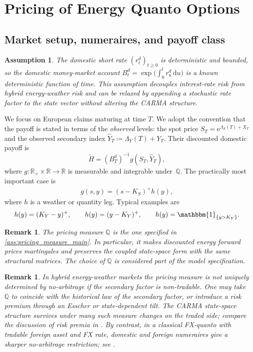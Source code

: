 \documentclass[10pt,a4paper,reqno]{amsart}
\newtheorem{remark}[theorem]{Remark}
\newtheorem{assumption}[theorem]{Assumption}
\newcommand{\R}{\mathbb{R}}
\newcommand{\Q}{\mathbb{Q}}
\newcommand{\1}{\mathbbm{1}}
\newcommand{\dd}{\mathrm{d}}
\newcommand{\ee}{\mathrm{e}}
\begin{document}
\section{Pricing of Energy Quanto Options}\label{sec:pricing-quanto-options}

\subsection{Market setup, numeraires, and payoff class}

\begin{assumption}\label{ass:interest_rate}
The domestic short rate $(r_t^d)_{t \ge 0}$ is deterministic and bounded,
so the domestic money-market account
$B_t^d = \exp\!\bigl(\int_0^t r_u^d\,\dd u\bigr)$ is a known deterministic
function of time. This assumption decouples interest-rate risk from hybrid
energy-weather risk and can be relaxed by appending a stochastic rate factor to
the state vector without altering the CARMA structure.
\end{assumption}

We focus on European claims maturing at time $T$. We adopt the convention
that the payoff is stated in terms of the \emph{observed} levels: the spot
price $S_T = \ee^{\Lambda_S(T)+X_T}$ and the observed secondary index
$\widehat{Y}_T \coloneqq \Lambda_Y(T)+Y_T$. Their discounted domestic payoff
is
$$
\widetilde{H}
= (B_T^d)^{-1} g(S_T,\widehat{Y}_T),
$$
where $g:\R_+ \times \R \to \R$ is measurable and integrable under~$\Q$.
The practically most important case is
\begin{align}\label{eq:quanto_payoff_general}
  g(s,y) = (s-K_S)^+ h(y),
\end{align}
where $h$ is a weather or quantity leg. Typical examples are
$$
h(y) = (K_Y-y)^+,\qquad
h(y) = (y-K_Y)^+,\qquad
h(y) = \1_{\{y>K_Y\}}.
$$

\begin{remark}
The pricing measure $\Q$ is the one specified in
\ref{ass:pricing_measure_main}. In particular, it
makes discounted energy forward prices martingales and preserves the coupled
state-space form with the same structural matrices. The choice of $\Q$ is
considered part of the model specification.
\end{remark}

\begin{remark}
In hybrid energy-weather markets the pricing measure is not uniquely
determined by no-arbitrage if the secondary factor is non-tradable. One may
take $\Q$ to coincide with the historical law of the secondary factor, or
introduce a risk premium through an Esscher or state-dependent tilt. The
CARMA state-space structure survives under many such measure changes on the
traded side; compare the discussion of risk premia in \citet{Ben14}. By
contrast, in a classical FX-quanto with tradable foreign asset and FX rate,
domestic and foreign numeraires give a sharper no-arbitrage restriction; see
\citet{Hul21}.
\end{remark}
\end{document}
